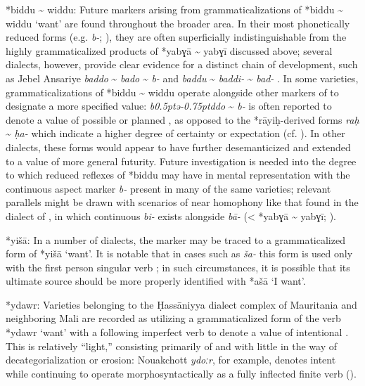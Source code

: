 \documentclass[output=paper]{langsci/langscibook}
\begin{document}
\begin{altdescription}
\item[*{biddu {\textasciitilde} widdu}:]
Future  markers arising from grammaticalizations of *{biddu {\textasciitilde} widdu} ‘want’ are found throughout the broader  area. In their most phonetically reduced forms (e.g.  \textit{b-}; \citealt{Behnstedt1994Soukhne}), they are often superficially indistinguishable from the highly grammaticalized products of *{yabɣā {\textasciitilde} yabɣī} discussed above; several dialects, however, provide clear evidence for a distinct chain of development, such as Jebel An\-sa\-ri\-ye \textit{baddo} {\textasciitilde} \textit{bado} {\textasciitilde} \textit{b-} \citep{Lewin1969} and  \textit{baddu} {\textasciitilde} \textit{baddi-} {\textasciitilde} \textit{bad-} \citep{Procházka2011Cilician}. In some varieties, grammaticalizations of *{biddu {\textasciitilde} widdu} operate alongside other markers of   to designate a more specified value:  \textit{b\kern 0.5ptǝ\kern -0.75ptddo} {\textasciitilde} \textit{b-} is often reported to denote a  value of possible or planned , as opposed to the *rāyiḥ{}-derived forms \textit{raḥ} {\textasciitilde} \textit{ḥa-} which indicate a higher degree of certainty or expectation (cf. \citealt{Lentin2011Damascus}). In other dialects, these forms would appear to have further desemanticized and extended to a value of more general futurity.  Future investigation is needed into the degree to which reduced reflexes of *biddu may have  in mental representation with the continuous aspect marker \textit{b-} present in many of the same varieties; relevant parallels might be drawn with scenarios of near homophony like that found in the dialect of , in which continuous \textit{bi-} exists alongside  \textit{bā}\textit{{}-} (< *yabɣā {\textasciitilde} yabɣī; \citealt{Davey2016}).

\item[*{yišā}:]
In a number of  dialects, the   marker may be traced to a grammaticalized form of *{yišā} ‘want’. It is notable that in cases such as  \textit{ša-} this form is used only with the first person singular verb \citep{Watson1993}; in such circumstances, it is possible that its ultimate source should be more properly identified with *{ašā} ‘I want’.

\item[*{ydawr}:]\largerpage
Varieties belonging to the Ḥassāniyya dialect complex of Mauritania and neighboring Mali are recorded as utilizing a grammaticalized form of the verb *{ydawr} ‘want’ with a following imperfect verb to denote a value of intentional . This  is relatively “light,” consisting primarily of  and  with little in the way of decategorialization or erosion: Nouakchott \textit{ydoːr}, for example, denotes  intent while continuing to operate morphosyntactically as a fully inflected finite verb (\citealt{Taine-Cheikh2011hass}).


\end{altdescription}
\end{document}
